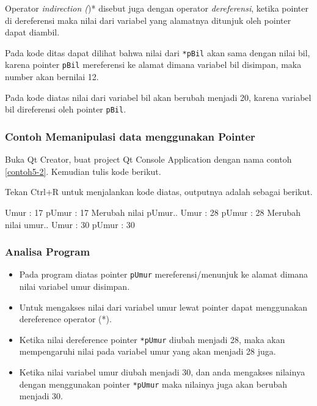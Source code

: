 Operator \emph{indirection (})* disebut juga dengan operator
\emph{dereferensi}, ketika pointer di dereferensi maka nilai dari
variabel yang alamatnya ditunjuk oleh pointer dapat diambil.



Pada kode ditas dapat dilihat bahwa nilai dari \texttt{*pBil} akan sama
dengan nilai bil, karena pointer \texttt{pBil} mereferensi ke alamat
dimana variabel bil disimpan, maka number akan bernilai 12.



Pada kode diatas nilai dari variabel bil akan berubah menjadi 20, karena
variabel bil direferensi oleh pointer \texttt{pBil}.

\subsubsection*{Contoh Memanipulasi data menggunakan Pointer}

Buka Qt Creator, buat project Qt Console Application dengan nama contoh
\ref{contoh5-2}. Kemudian tulis kode berikut.



Tekan Ctrl+R untuk menjalankan kode diatas, outputnya adalah sebagai
berikut.

\begin{lcverbatim}
Umur : 17
pUmur : 17
Merubah nilai pUmur..
Umur : 28
pUmur : 28
Merubah nilai umur..
Umur : 30
pUmur : 30
\end{lcverbatim}

\subsubsection*{Analisa Program}

\begin{itemize}

\item
 Pada program diatas pointer \texttt{pUmur} mereferensi/menunjuk ke
 alamat dimana nilai variabel umur disimpan.
\item
 Untuk mengakses nilai dari variabel umur lewat pointer dapat
 menggunakan dereference operator (*).
\item
 Ketika nilai dereference pointer \texttt{*pUmur} diubah menjadi 28,
 maka akan mempengaruhi nilai pada variabel umur yang akan menjadi 28
 juga.
\item
 Ketika nilai variabel umur diubah menjadi 30, dan anda mengakses
 nilainya dengan menggunakan pointer \texttt{*pUmur} maka nilainya juga
 akan berubah menjadi 30.
\end{itemize}

